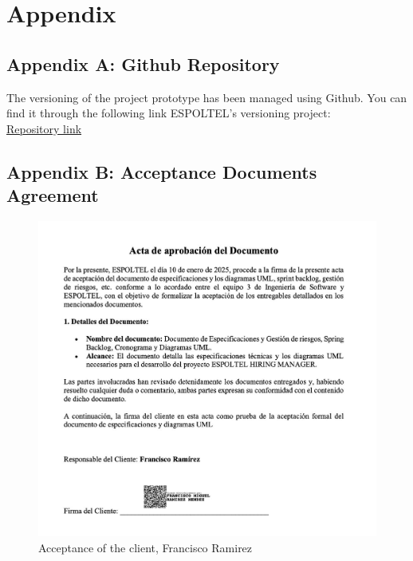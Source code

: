 \documentclass{scrreprt}
\begin{document}
\chapter{Appendix}

\section{Appendix A: Github Repository}
The versioning of the project prototype has been managed using Github. You can find it through the following link ESPOLTEL's versioning project:\\ \href{https://github.com/Jeremy-Poveda/EspoltelHiringManager}{Repository link}
\section{Appendix B: Acceptance Documents Agreement}
 \begin{figure}[H]
 	\centering  \small
 	\includegraphics[width=\textwidth]{Acceptance.jpeg} 
 	\caption{Acceptance of the client, Francisco Ramirez}
 	\label{fig:Acceptance}
 \end{figure}
\FloatBarrier 
\end{document}
